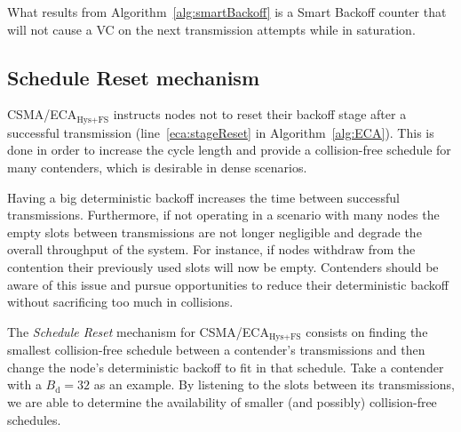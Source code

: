 What results from Algorithm~\ref{alg:smartBackoff} is a Smart Backoff counter that will not cause a VC on the next transmission attempts while in saturation.

\subsection{Schedule Reset mechanism}\label{scheduleReset}
CSMA/ECA$_{\text{Hys+FS}}$ instructs nodes not to reset their backoff stage after a successful transmission (line~\ref{eca:stageReset} in Algorithm~\ref{alg:ECA}). This is done in order to increase the cycle length and provide a collision-free schedule for many contenders, which is desirable in dense scenarios.


Having a big deterministic backoff increases the time between successful transmissions. Furthermore, if not operating in a scenario with many nodes the empty slots between transmissions are not longer negligible and degrade the overall throughput of the system. For instance, if nodes withdraw from the contention their previously used slots will now be empty. Contenders should be aware of this issue and pursue opportunities to reduce their deterministic backoff without sacrificing too much in collisions. 

The \emph{Schedule Reset} mechanism for CSMA/ECA$_{\text{Hys+FS}}$ consists on finding the smallest collision-free schedule between a contender's transmissions and then change the node's deterministic backoff to fit in that schedule. Take a contender with a $B_{\text{d}}=32$ as an example. By listening to the slots between its transmissions, we are able to determine the availability of smaller (and possibly) collision-free schedules. 


